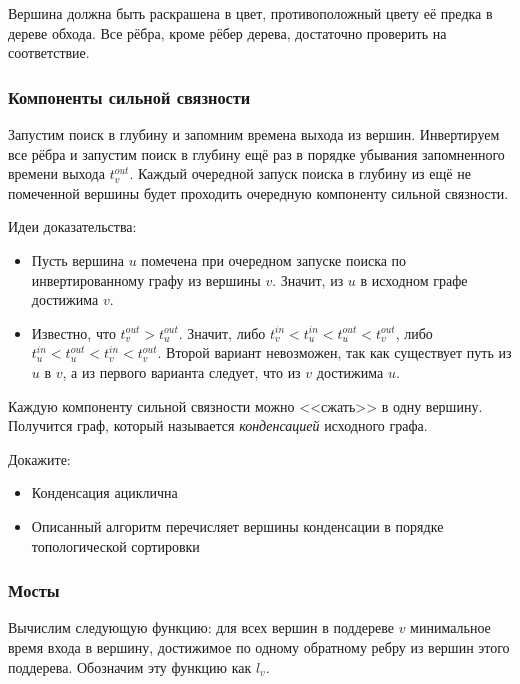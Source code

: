 \documentclass[a4paper,12pt]{article}
\begin{document}
      Вершина должна быть раскрашена в цвет, противоположный цвету
      её предка в дереве обхода. Все рёбра, кроме рёбер дерева,
      достаточно проверить на соответствие.

      \subsubsection{Компоненты сильной связности}

      Запустим поиск в глубину и запомним времена выхода из вершин.
      Инвертируем все рёбра и запустим поиск в глубину ещё раз
      в порядке убывания запомненного времени выхода $t^{out}_v$.
      Каждый очередной запуск поиска в глубину из ещё не помеченной
      вершины будет проходить очередную компоненту сильной связности.

      Идеи доказательства:
      \begin{itemize}
        \item Пусть вершина $u$ помечена при очередном запуске поиска
          по инвертированному графу из вершины $v$.
          Значит, из $u$ в исходном графе достижима $v$.
        \item Известно, что $t^{out}_v > t^{out}_u$. Значит, либо
          $t^{in}_v < t^{in}_u < t^{out}_u < t^{out}_v$, либо
          $t^{in}_u < t^{out}_u < t^{in}_v < t^{out}_v$.
          Второй вариант невозможен, так как существует путь из
          $u$ в $v$, а из первого варианта следует, что из $v$
          достижима $u$.
      \end{itemize}

      Каждую компоненту сильной связности можно <<сжать>> в одну
      вершину. Получится граф, который называется
      \emph{конденсацией} исходного графа.
      
      Докажите:
      \begin{itemize}
        \item Конденсация ациклична
        \item Описанный алгоритм перечисляет вершины конденсации
          в порядке топологической сортировки
      \end{itemize}

      \subsubsection{Мосты}

      Вычислим следующую функцию: для всех вершин в поддереве $v$
      минимальное время входа в вершину, достижимое по одному
      обратному ребру из вершин этого поддерева. Обозначим эту
      функцию как $l_v$.
\end{document}
